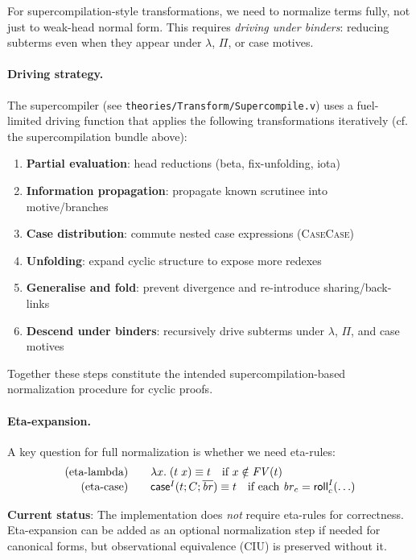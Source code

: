 For supercompilation-style transformations, we need to normalize terms fully, not just to weak-head normal form.
This requires \emph{driving under binders}: reducing subterms even when they appear under \(\lambda\), \(\Pi\), or case motives.

\paragraph{Driving strategy.}
The supercompiler (see \texttt{theories/Transform/Supercompile.v}) uses a fuel-limited driving function that applies the following transformations iteratively (cf. the supercompilation bundle above):
\begin{enumerate}
\item \textbf{Partial evaluation}: head reductions (beta, fix-unfolding, iota)
\item \textbf{Information propagation}: propagate known scrutinee into motive/branches
\item \textbf{Case distribution}: commute nested case expressions (\textsc{CaseCase})
\item \textbf{Unfolding}: expand cyclic structure to expose more redexes
\item \textbf{Generalise and fold}: prevent divergence and re-introduce sharing/back-links
\item \textbf{Descend under binders}: recursively drive subterms under \(\lambda\), \(\Pi\), and case motives
\end{enumerate}

Together these steps constitute the intended supercompilation-based normalization procedure for cyclic proofs.

\paragraph{Eta-expansion.}
A key question for full normalization is whether we need eta-rules:
\[
\begin{array}{rcl}
\text{(eta-lambda)} & & \lambda x.\; (t\; x) \equiv t \quad\text{if } x \notin \mathit{FV}(t) \\
\text{(eta-case)} & & \mathsf{case}^{I}(t;C;\overline{\mathit{br}}) \equiv t \quad\text{if each } \mathit{br}_c = \mathsf{roll}^{I}_{c}(\ldots)\\
\end{array}
\]

\textbf{Current status}: The implementation does \emph{not} require eta-rules for correctness.
Eta-expansion can be added as an optional normalization step if needed for canonical forms, but observational equivalence (CIU) is preserved without it.

